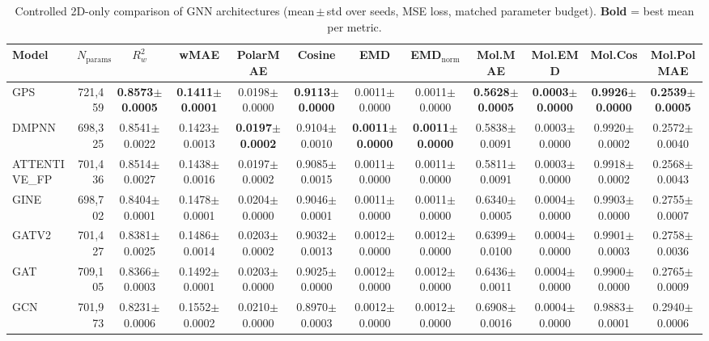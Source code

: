 \begin{table}[ht]
\centering
\caption{Controlled 2D-only comparison of GNN architectures (mean\,$\pm$\,std over seeds, MSE loss, matched parameter budget). \textbf{Bold} = best mean per metric.}
\label{tab:benchmark_2d_mse}
\small
\begin{tabular}{l r c c c c c c c c c c }
\toprule
Model & $N_{\text{params}}$ & $R^2_w$ & wMAE & PolarMAE & Cosine & EMD & EMD$_\mathrm{norm}$ & Mol.MAE & Mol.EMD & Mol.Cos & Mol.PolMAE \\
\midrule
GPS & 721,459 & \textbf{0.8573$\pm$0.0005} & \textbf{0.1411$\pm$0.0001} & 0.0198$\pm$0.0000 & \textbf{0.9113$\pm$0.0000} & 0.0011$\pm$0.0000 & 0.0011$\pm$0.0000 & \textbf{0.5628$\pm$0.0005} & \textbf{0.0003$\pm$0.0000} & \textbf{0.9926$\pm$0.0000} & \textbf{0.2539$\pm$0.0005} \\
DMPNN & 698,325 & 0.8541$\pm$0.0022 & 0.1423$\pm$0.0013 & \textbf{0.0197$\pm$0.0002} & 0.9104$\pm$0.0010 & \textbf{0.0011$\pm$0.0000} & \textbf{0.0011$\pm$0.0000} & 0.5838$\pm$0.0091 & 0.0003$\pm$0.0000 & 0.9920$\pm$0.0002 & 0.2572$\pm$0.0040 \\
ATTENTIVE_FP & 701,436 & 0.8514$\pm$0.0027 & 0.1438$\pm$0.0016 & 0.0197$\pm$0.0002 & 0.9085$\pm$0.0015 & 0.0011$\pm$0.0000 & 0.0011$\pm$0.0000 & 0.5811$\pm$0.0091 & 0.0003$\pm$0.0000 & 0.9918$\pm$0.0002 & 0.2568$\pm$0.0043 \\
GINE & 698,702 & 0.8404$\pm$0.0001 & 0.1478$\pm$0.0001 & 0.0204$\pm$0.0000 & 0.9046$\pm$0.0001 & 0.0011$\pm$0.0000 & 0.0011$\pm$0.0000 & 0.6340$\pm$0.0005 & 0.0004$\pm$0.0000 & 0.9903$\pm$0.0000 & 0.2755$\pm$0.0007 \\
GATV2 & 701,427 & 0.8381$\pm$0.0025 & 0.1486$\pm$0.0014 & 0.0203$\pm$0.0002 & 0.9032$\pm$0.0013 & 0.0012$\pm$0.0000 & 0.0012$\pm$0.0000 & 0.6399$\pm$0.0100 & 0.0004$\pm$0.0000 & 0.9901$\pm$0.0003 & 0.2758$\pm$0.0036 \\
GAT & 709,105 & 0.8366$\pm$0.0003 & 0.1492$\pm$0.0001 & 0.0203$\pm$0.0000 & 0.9025$\pm$0.0000 & 0.0012$\pm$0.0000 & 0.0012$\pm$0.0000 & 0.6436$\pm$0.0011 & 0.0004$\pm$0.0000 & 0.9900$\pm$0.0000 & 0.2765$\pm$0.0009 \\
GCN & 701,973 & 0.8231$\pm$0.0006 & 0.1552$\pm$0.0002 & 0.0210$\pm$0.0000 & 0.8970$\pm$0.0003 & 0.0012$\pm$0.0000 & 0.0012$\pm$0.0000 & 0.6908$\pm$0.0016 & 0.0004$\pm$0.0000 & 0.9883$\pm$0.0001 & 0.2940$\pm$0.0006 \\
\bottomrule
\end{tabular}
\end{table}
